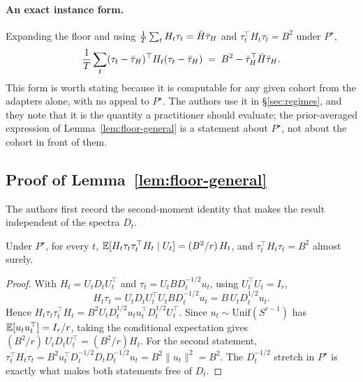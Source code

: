 \paragraph{An exact instance form.} Expanding the floor and using
$\frac1T\sum_t H_t\tau_t = \bar H\bar{\tau}_H$ and
$\tau_t^\top H_t \tau_t = B^2$ under $P^\star$,
\begin{equation}\label{eq:floor-exact}
  \frac1T\sum_t (\tau_t-\bar{\tau}_H)^\top H_t (\tau_t-\bar{\tau}_H)
  \;=\; B^2 - \bar{\tau}_H^\top \bar H \bar{\tau}_H .
\end{equation}
This form is worth stating because it is computable for any given cohort from
the adapters alone, with no appeal to $P^\star$. The authors use it in
\S\ref{sec:regimes}, and they note that it is the quantity a practitioner should
evaluate; the prior-averaged expression of Lemma~\ref{lem:floor-general} is a
statement about $P^\star$, not about the cohort in front of them.

\subsection{Proof of Lemma~\ref{lem:floor-general}}

The authors first record the second-moment identity that makes the result independent
of the spectra $D_t$.

\begin{claim}\label{clm:second-moment}
Under $P^\star$, for every $t$,
$\mathbb{E}[H_t \tau_t \tau_t^\top H_t \mid U_t] = (B^2/r)\, H_t$, and
$\tau_t^\top H_t \tau_t = B^2$ almost surely.
\end{claim}

\begin{proof}
With $H_t = U_t D_t U_t^\top$ and $\tau_t = U_t B D_t^{-1/2} u_t$, using
$U_t^\top U_t = I_r$,
\begin{equation*}
  H_t \tau_t = U_t D_t U_t^\top U_t B D_t^{-1/2} u_t
             = B\, U_t D_t^{1/2} u_t .
\end{equation*}
Hence $H_t \tau_t \tau_t^\top H_t = B^2 U_t D_t^{1/2} u_t u_t^\top D_t^{1/2}
U_t^\top$. Since $u_t \sim \mathrm{Unif}(S^{r-1})$ has
$\mathbb{E}[u_t u_t^\top] = I_r / r$, taking the conditional expectation gives
$(B^2/r)\,U_t D_t U_t^\top = (B^2/r) H_t$. For the second statement,
$\tau_t^\top H_t \tau_t = B^2 u_t^\top D_t^{-1/2} D_t D_t^{-1/2} u_t
= B^2 \|u_t\|^2 = B^2$. The $D_t^{-1/2}$ stretch in $P^\star$ is exactly what
makes both statements free of $D_t$.
\end{proof}

